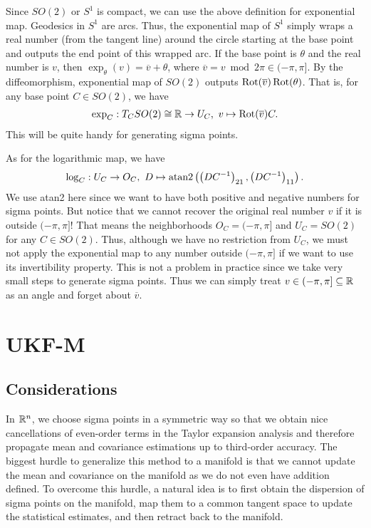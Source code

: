 \documentclass[12pt]{article}
\begin{document}
\begin{eg}[$SO(2)$]
Since $ SO(2)$ or $ S^{1}$ is compact, we can use the above definition for exponential map. Geodesics in $ S^{1}$ are arcs. Thus, the exponential map of $ S^{1}$ simply wraps a real number (from the tangent line) around the circle starting at the base point and outputs the end point of this wrapped arc. If the base point is $ \theta$ and the real number is $ v$, then  $ \exp_{\theta}(v) = \overline{v}+\theta$, where $ \overline{v} = v \bmod 2\pi \in (-\pi,\pi]$. By the diffeomorphism, exponential map of $ SO(2)$ outputs $\operatorname{Rot}(\overline{v}) \operatorname{Rot}(\theta)$. That is, for any base point $ C \in SO(2)$, we have
\begin{align*}
	\exp_{ C} : T_{C} SO(2) \cong \mathbb{R} \to U_C,\ v \mapsto \operatorname{Rot}(\overline{v})C. 
\end{align*}
This will be quite handy for generating sigma points.

As for the logarithmic map, we have
\begin{align*}
	\log_{ C} : U_{ C} \to O_C,\ D \mapsto \atan2 \left( \left(D C^{-1}\right)_{21}, \left(D C^{-1}\right)_{11}\right).
\end{align*}
We use \textsf{atan2} here since we want to have both positive and negative numbers for sigma points. But notice that we cannot recover the original real number $ v$ if it is outside $ (-\pi,\pi]$! That means the neighborhoods $ O_C = (-\pi,\pi]$ and $ U_C = SO(2)$ for any  $ C \in SO(2)$. Thus, although we have no restriction from $ U_C$, we must not apply the exponential map to any number outside $(-\pi,\pi]$ if we want to use its invertibility property. This is not a problem in practice since we take very small steps to generate sigma points. Thus we can simply treat $ v \in (-\pi,\pi] \subseteq \mathbb{R}$ as an angle and forget about $ \overline{v}$.
\end{eg}


\section{UKF-M}
\subsection{Considerations}
In $ \mathbb{R}^{n}$, we choose sigma points in a symmetric way so that we obtain nice cancellations of even-order terms in the Taylor expansion analysis and therefore propagate mean and covariance estimations up to third-order accuracy. The biggest hurdle to generalize this method to a manifold is that we cannot update the mean and covariance on the manifold as we do not even have addition defined. To overcome this hurdle, a natural idea is to first obtain the dispersion of sigma points on the manifold, map them to a common tangent space to update the statistical estimates, and then retract back to the manifold.
\end{document}
